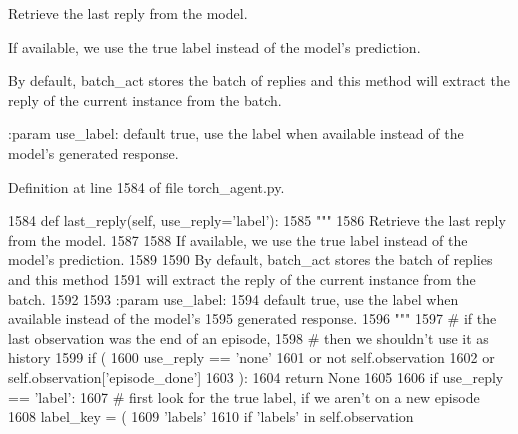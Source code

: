\begin{DoxyVerb}Retrieve the last reply from the model.

If available, we use the true label instead of the model's prediction.

By default, batch_act stores the batch of replies and this method
will extract the reply of the current instance from the batch.

:param use_label:
    default true, use the label when available instead of the model's
    generated response.
\end{DoxyVerb}
 

Definition at line 1584 of file torch\+\_\+agent.\+py.


\begin{DoxyCode}
1584     \textcolor{keyword}{def }last\_reply(self, use\_reply='label'):
1585         \textcolor{stringliteral}{"""}
1586 \textcolor{stringliteral}{        Retrieve the last reply from the model.}
1587 \textcolor{stringliteral}{}
1588 \textcolor{stringliteral}{        If available, we use the true label instead of the model's prediction.}
1589 \textcolor{stringliteral}{}
1590 \textcolor{stringliteral}{        By default, batch\_act stores the batch of replies and this method}
1591 \textcolor{stringliteral}{        will extract the reply of the current instance from the batch.}
1592 \textcolor{stringliteral}{}
1593 \textcolor{stringliteral}{        :param use\_label:}
1594 \textcolor{stringliteral}{            default true, use the label when available instead of the model's}
1595 \textcolor{stringliteral}{            generated response.}
1596 \textcolor{stringliteral}{        """}
1597         \textcolor{comment}{# if the last observation was the end of an episode,}
1598         \textcolor{comment}{# then we shouldn't use it as history}
1599         \textcolor{keywordflow}{if} (
1600             use\_reply == \textcolor{stringliteral}{'none'}
1601             \textcolor{keywordflow}{or} \textcolor{keywordflow}{not} self.observation
1602             \textcolor{keywordflow}{or} self.observation[\textcolor{stringliteral}{'episode\_done'}]
1603         ):
1604             \textcolor{keywordflow}{return} \textcolor{keywordtype}{None}
1605 
1606         \textcolor{keywordflow}{if} use\_reply == \textcolor{stringliteral}{'label'}:
1607             \textcolor{comment}{# first look for the true label, if we aren't on a new episode}
1608             label\_key = (
1609                 \textcolor{stringliteral}{'labels'}
1610                 \textcolor{keywordflow}{if} \textcolor{stringliteral}{'labels'} \textcolor{keywordflow}{in} self.observation

\end{DoxyCode}
